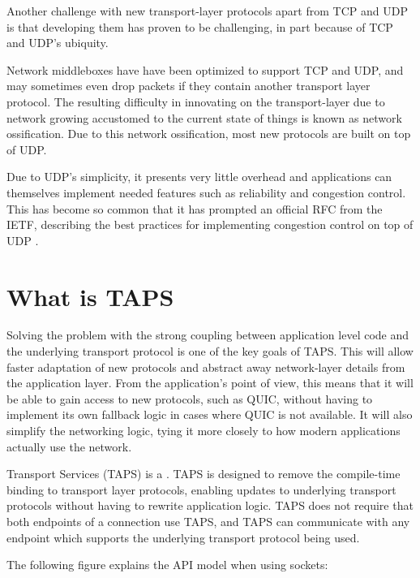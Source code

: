 Another challenge with new transport-layer protocols apart
from TCP and UDP is that developing them has proven to be challenging, 
in part because of TCP and UDP's ubiquity. 

Network middleboxes have have been
optimized to support TCP and UDP, and may sometimes
even drop packets if they contain another transport layer protocol.
The resulting difficulty in innovating on the transport-layer
due to network growing accustomed to the current state of things
is known as network ossification. Due to this network ossification,
most new protocols are built on top of UDP.

Due to UDP's simplicity, it presents very little overhead
and applications can themselves implement needed features
such as reliability and congestion control.
This has become so common that
it has prompted an official RFC from the IETF, describing
the best practices for implementing congestion control on top of UDP 
\cite{eggertUnicastUDPUsage2008}.

\section{What is TAPS}
Solving the problem with the strong coupling between application
level code and the underlying transport protocol
is one of the key goals of TAPS. This will allow faster adaptation
of new protocols and abstract away network-layer details from the
application layer. From the application's point of view, this
means that it will be able to gain access to new protocols, such
as QUIC, without having to implement its own fallback logic
in cases where QUIC is not available. It will also simplify
the networking logic, tying it more closely to how modern
applications actually use the network.

Transport Services (TAPS) is a 
\cite{trammellAbstractApplicationProgramming2025}. TAPS is
designed to remove the compile-time binding to transport layer
protocols, enabling updates to underlying transport protocols
without having to rewrite application logic. TAPS does not
require that both endpoints of a connection use TAPS, and TAPS
can communicate with any endpoint which supports the underlying
transport protocol being used.

The following figure explains the API model when using
sockets: 

